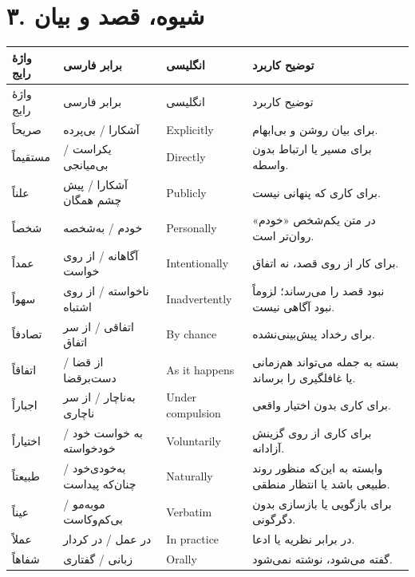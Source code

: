 \section*{۳. شیوه، قصد و بیان}
\begingroup
\small
\setlength{\tabcolsep}{4pt}
\renewcommand{\arraystretch}{1.3}
\begin{longtable}{|p{2.5cm}|p{4.0cm}|p{2.3cm}|p{5.3cm}|}
\hline
واژهٔ رایج & برابر فارسی & انگلیسی & توضیح کاربرد \\
\hline
\endfirsthead
\hline
واژهٔ رایج & برابر فارسی & انگلیسی & توضیح کاربرد \\
\hline
\endhead

صریحاً & آشکارا / بی‌پرده & \textenglish{Explicitly} & برای بیان روشن و بی‌ابهام. \\
\hline
مستقیماً & یکراست / بی‌میانجی & \textenglish{Directly} & برای مسیر یا ارتباط بدون واسطه. \\
\hline
علناً & آشکارا / پیش چشم همگان & \textenglish{Publicly} & برای کاری که پنهانی نیست. \\
\hline
شخصاً & خودم / به‌شخصه & \textenglish{Personally} & در متن یکم‌شخص «خودم» روان‌تر است. \\
\hline
عمداً & آگاهانه / از روی خواست & \textenglish{Intentionally} & برای کار از روی قصد، نه اتفاق. \\
\hline
سهواً & ناخواسته / از روی اشتباه & \textenglish{Inadvertently} & نبود قصد را می‌رساند؛ لزوماً نبود آگاهی نیست. \\
\hline
تصادفاً & اتفاقی / از سر اتفاق & \textenglish{By chance} & برای رخداد پیش‌بینی‌نشده. \\
\hline
اتفاقاً & از قضا / دست‌برقضا & \textenglish{As it happens} & بسته به جمله می‌تواند هم‌زمانی یا غافلگیری را برساند. \\
\hline
اجباراً & به‌ناچار / از سر ناچاری & \textenglish{Under compulsion} & برای کاری بدون اختیار واقعی. \\
\hline
اختیاراً & به خواست خود / خودخواسته & \textenglish{Voluntarily} & برای کاری از روی گزینش آزادانه. \\
\hline
طبیعتاً & به‌خودی‌خود / چنان‌که پیداست & \textenglish{Naturally} & وابسته به این‌که منظور روند طبیعی باشد یا انتظار منطقی. \\
\hline
عیناً & مو‌به‌مو / بی‌کم‌وکاست & \textenglish{Verbatim} & برای بازگویی یا بازسازی بدون دگرگونی. \\
\hline
عملاً & در عمل / در کردار & \textenglish{In practice} & در برابر نظریه یا ادعا. \\
\hline
شفاهاً & زبانی / گفتاری & \textenglish{Orally} & گفته می‌شود، نوشته نمی‌شود. \\

\end{longtable}
